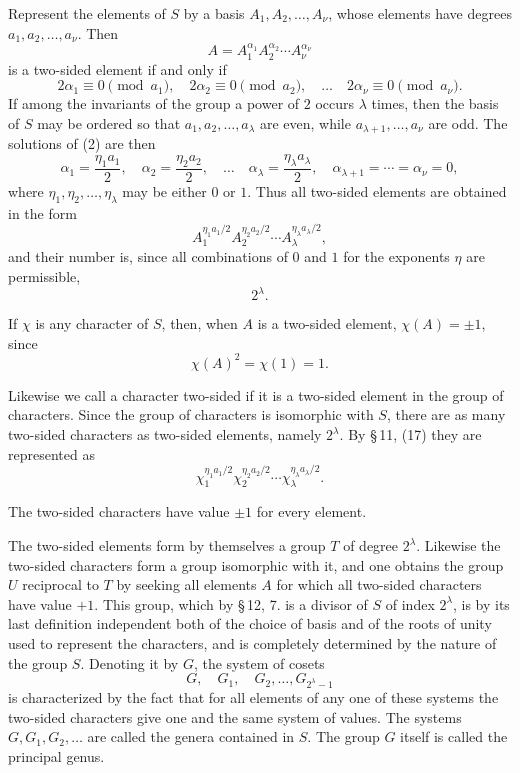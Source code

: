 \documentclass[11pt]{article}
\begin{document}
Represent the elements of $S$ by a basis $A_1,A_2,
\ldots,A_\nu$, whose elements have degrees $a_1,a_2,
\ldots,a_\nu$. Then
\begin{equation}
A=A_1^{\alpha_1}A_2^{\alpha_2}\cdots A_\nu^{\alpha_\nu}
\tag{1}
\end{equation}
is a two-sided element if and only if
\begin{equation}
2\alpha_1\equiv0\pmod{a_1},
\quad 2\alpha_2\equiv0\pmod{a_2},
\quad\ldots\quad
2\alpha_\nu\equiv0\pmod{a_\nu}.
\tag{2}
\end{equation}
If among the invariants of the group a power of $2$ occurs $\lambda$ times, then the basis of $S$ may be ordered so that $a_1,a_2,
\ldots,a_\lambda$ are even, while $a_{\lambda+1},
\ldots,a_\nu$ are odd. The solutions of (2) are then
\[
\alpha_1=\frac{\eta_1a_1}{2},
\quad
\alpha_2=\frac{\eta_2a_2}{2},
\quad\ldots\quad
\alpha_\lambda=\frac{\eta_\lambda a_\lambda}{2},
\quad
\alpha_{\lambda+1}=\cdots=\alpha_\nu=0,
\]
where $\eta_1,
\eta_2,
\ldots,
\eta_\lambda$ may be either $0$ or $1$. Thus all two-sided elements are obtained in the form
\[
A_1^{\eta_1a_1/2}A_2^{\eta_2a_2/2}\cdots A_\lambda^{\eta_\lambda a_\lambda/2},
\]
and their number is, since all combinations of $0$ and $1$ for the exponents $\eta$ are permissible,
\[
2^\lambda.
\]

If $\chi$ is any character of $S$, then, when $A$ is a two-sided element, $\chi(A)=\pm1$, since
\[
\chi(A)^2=\chi(1)=1.
\]

Likewise we call a character two-sided if it is a two-sided element in the group of characters. Since the group of characters is isomorphic with $S$, there are as many two-sided characters as two-sided elements, namely $2^\lambda$. By \S\,11, (17) they are represented as
\[
\chi_1^{\eta_1a_1/2}\chi_2^{\eta_2a_2/2}\cdots\chi_\lambda^{\eta_\lambda a_\lambda/2}.
\]

The two-sided characters have value $\pm1$ for every element.

The two-sided elements form by themselves a group $T$ of degree $2^\lambda$. Likewise the two-sided characters form a group isomorphic with it, and one obtains the group $U$ reciprocal to $T$ by seeking all elements $A$ for which all two-sided characters have value $+1$. This group, which by \S\,12, 7. is a divisor of $S$ of index $2^\lambda$, is by its last definition independent both of the choice of basis and of the roots of unity used to represent the characters, and is completely determined by the nature of the group $S$. Denoting it by $G$, the system of cosets
\begin{equation}
G,
\quad G_1,
\quad G_2,
\ldots,
G_{2^\lambda-1}
\tag{3}
\end{equation}
is characterized by the fact that for all elements of any one of these systems the two-sided characters give one and the same system of values. The systems $G,G_1,G_2,
\ldots$ are called the genera contained in $S$. The group $G$ itself is called the principal genus.
\end{document}
